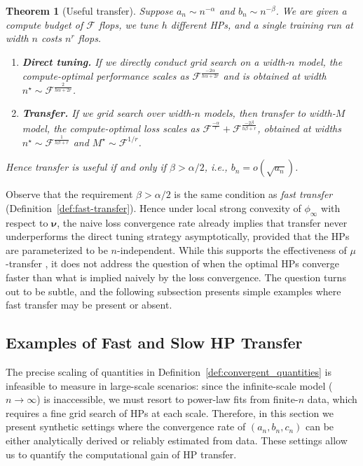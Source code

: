 \documentclass{article} %
\newtheorem{theorem}{Theorem}
\newcommand{\bhp}{\bm{\nu}}                       %
\newcommand{\compexp}{r}
\newcommand{\numhps}{h}
\newcommand{\flops}{\mathcal{F}}
\renewcommand{\citep}[1]{\cite{#1}}
\begin{document}
\begin{theorem}[Useful transfer]\label{thm:grid_and_transfer_rate}
Suppose $a_n \sim n^{-\alpha}$ and $b_n \sim n^{-\beta}$. We are given a compute budget of $\flops$ flops, we tune $\numhps$ different HPs, and a single training run at width $n$ costs $n^{\compexp}$ flops. 
\begin{enumerate}[label=(\alph*),leftmargin=*,]
    \item \textbf{Direct tuning.} If we directly conduct grid search on a width-$n$ model, the compute-optimal performance scales as $\flops^{\frac{-2\alpha}{\numhps \alpha + 2 \compexp}}$ and is obtained at width $n^\star \sim \flops^{\frac{2}{\numhps \alpha + 2 \compexp}}$.
    \item \textbf{Transfer.} If we grid search over width-$n$ models, then transfer to width-$M$ model, the compute-optimal loss scales as $\flops^{\frac{-\alpha}{\compexp}} + \flops^{\frac{-2\beta}{\numhps \beta + \compexp}}$, obtained at widths $n^\star \sim \flops^{\frac{1}{\numhps \beta + \compexp}}$ and $M^\star \sim \flops^{1/\compexp}$. 
\end{enumerate}
Hence transfer is useful if and only if $\beta > \alpha / 2$, i.e., $b_n = o(\sqrt{a_n})$. 
\end{theorem}

Observe that the requirement $\beta>\alpha/2$ is the same condition as \textit{fast transfer} (Definition~\ref{def:fast-transfer}). Hence under local strong convexity of $\phi_\infty$ with respect to $\bhp$, the naive loss convergence rate already implies that transfer never underperforms the direct tuning strategy asymptotically, provided that the HPs are parameterized to be $n$-independent. While this supports the effectiveness of $\mu$-transfer \citep{yang2022tensor}, it does not address the question of when the optimal HPs converge faster than what is implied naively by the loss convergence. The question turns out to be subtle, and the following subsection presents simple examples where fast transfer may be present or absent. 

\vspace{-1.mm}
\subsection{Examples of Fast and Slow HP Transfer}\label{sec:examples}
\vspace{-1.mm}

The precise scaling of quantities in Definition~\ref{def:convergent_quantities} is infeasible to measure in large-scale scenarios: since the infinite-scale model ($n\to\infty$) is inaccessible, we must resort to power-law fits from finite-$n$ data, which requires a fine grid search of HPs at each scale. Therefore, in this section we present synthetic settings where the convergence rate of $(a_n,b_n,c_n)$ can be either analytically derived or reliably estimated from data. These settings allow us to quantify the computational gain of HP transfer. 
\end{document}
